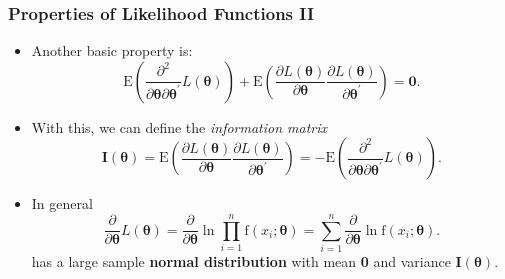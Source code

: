 \documentclass{beamer}
\begin{document}
\begin{frame}[shrink=2]
\frametitle{Properties of Likelihood Functions II}
\begin{itemize}
\item Another basic property is:
\begin{equation*}\label{E11:HessianZero}
\mathrm{E} \left( \frac{ \partial^2}{\partial \boldsymbol \theta
\partial \boldsymbol \theta^{\prime}} L(\boldsymbol \theta) \right)
+ \mathrm{E} \left( \frac{ \partial L(\boldsymbol \theta)}{\partial
\boldsymbol \theta} \frac{ \partial L(\boldsymbol \theta)}{\partial
\boldsymbol \theta^{\prime}}
 \right) = \mathbf 0.
\end{equation*}
\item With this, we can define the \emph{information matrix}
\begin{equation*}\label{E11:InfoMatrix}
\mathbf{I}(\boldsymbol \theta) = \mathrm{E} \left( \frac{ \partial
L(\boldsymbol \theta)}{\partial \boldsymbol \theta} \frac{ \partial
L(\boldsymbol \theta)}{\partial \boldsymbol \theta^{\prime}}
 \right) = -\mathrm{E} \left( \frac{ \partial^2}{\partial \boldsymbol \theta
\partial \boldsymbol \theta^{\prime}} L(\boldsymbol \theta) \right).
\end{equation*}
\item In general
\begin{equation*}
\frac{ \partial}{\partial \boldsymbol \theta} L(\boldsymbol \theta)
=\frac{ \partial}{\partial \boldsymbol \theta} \ln \prod_{i=1}^n
\mathrm{f}(x_i;\boldsymbol \theta ) =\sum_{i=1}^n \frac{
\partial}{\partial \boldsymbol \theta}
\ln \mathrm{f}(x_i;\boldsymbol \theta ).
\end{equation*}
has a large sample \textbf{normal distribution} with mean \textbf{0} and variance $\mathbf{I}(\boldsymbol \theta)$.
\end{itemize}
\end{frame}
\end{document}
